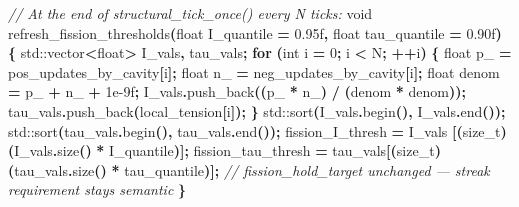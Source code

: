 \documentclass[
  11pt,
  a4paper,
]{article}
\newenvironment{Shaded}{\begin{snugshade}}{\end{snugshade}}
\newcommand{\BuiltInTok}[1]{#1}
\newcommand{\CommentTok}[1]{\textcolor[rgb]{0.56,0.35,0.01}{\textit{#1}}}
\newcommand{\ControlFlowTok}[1]{\textcolor[rgb]{0.13,0.29,0.53}{\textbf{#1}}}
\newcommand{\DataTypeTok}[1]{\textcolor[rgb]{0.13,0.29,0.53}{#1}}
\newcommand{\DecValTok}[1]{\textcolor[rgb]{0.00,0.00,0.81}{#1}}
\newcommand{\FloatTok}[1]{\textcolor[rgb]{0.00,0.00,0.81}{#1}}
\newcommand{\NormalTok}[1]{#1}
\newcommand{\OperatorTok}[1]{\textcolor[rgb]{0.81,0.36,0.00}{\textbf{#1}}}
\newcommand{\VariableTok}[1]{\textcolor[rgb]{0.00,0.00,0.00}{#1}}
\begin{document}
\begin{Shaded}
\begin{Highlighting}[]
\CommentTok{// At the end of structural\_tick\_once() every N ticks:}
\DataTypeTok{void}\NormalTok{ refresh\_fission\_thresholds}\OperatorTok{(}\DataTypeTok{float}\NormalTok{ I\_quantile }\OperatorTok{=} \FloatTok{0.95}\BuiltInTok{f}\OperatorTok{,}
                                \DataTypeTok{float}\NormalTok{ tau\_quantile }\OperatorTok{=} \FloatTok{0.90}\BuiltInTok{f}\OperatorTok{)}
\OperatorTok{\{}
    \BuiltInTok{std::}\NormalTok{vector}\OperatorTok{\textless{}}\DataTypeTok{float}\OperatorTok{\textgreater{}}\NormalTok{ I\_vals}\OperatorTok{,}\NormalTok{ tau\_vals}\OperatorTok{;}
    \ControlFlowTok{for} \OperatorTok{(}\DataTypeTok{int}\NormalTok{ i }\OperatorTok{=} \DecValTok{0}\OperatorTok{;}\NormalTok{ i }\OperatorTok{\textless{}}\NormalTok{ N}\OperatorTok{;} \OperatorTok{++}\NormalTok{i}\OperatorTok{)} \OperatorTok{\{}
        \DataTypeTok{float} \VariableTok{p\_} \OperatorTok{=}\NormalTok{ pos\_updates\_by\_cavity}\OperatorTok{[}\NormalTok{i}\OperatorTok{];}
        \DataTypeTok{float} \VariableTok{n\_} \OperatorTok{=}\NormalTok{ neg\_updates\_by\_cavity}\OperatorTok{[}\NormalTok{i}\OperatorTok{];}
        \DataTypeTok{float}\NormalTok{ denom }\OperatorTok{=} \VariableTok{p\_} \OperatorTok{+} \VariableTok{n\_} \OperatorTok{+} \FloatTok{1e{-}9}\BuiltInTok{f}\OperatorTok{;}
\NormalTok{        I\_vals}\OperatorTok{.}\NormalTok{push\_back}\OperatorTok{((}\VariableTok{p\_} \OperatorTok{*} \VariableTok{n\_}\OperatorTok{)} \OperatorTok{/} \OperatorTok{(}\NormalTok{denom }\OperatorTok{*}\NormalTok{ denom}\OperatorTok{));}
\NormalTok{        tau\_vals}\OperatorTok{.}\NormalTok{push\_back}\OperatorTok{(}\NormalTok{local\_tension}\OperatorTok{[}\NormalTok{i}\OperatorTok{]);}
    \OperatorTok{\}}
    \BuiltInTok{std::}\NormalTok{sort}\OperatorTok{(}\NormalTok{I\_vals}\OperatorTok{.}\NormalTok{begin}\OperatorTok{(),}\NormalTok{ I\_vals}\OperatorTok{.}\NormalTok{end}\OperatorTok{());}
    \BuiltInTok{std::}\NormalTok{sort}\OperatorTok{(}\NormalTok{tau\_vals}\OperatorTok{.}\NormalTok{begin}\OperatorTok{(),}\NormalTok{ tau\_vals}\OperatorTok{.}\NormalTok{end}\OperatorTok{());}
\NormalTok{    fission\_I\_thresh   }\OperatorTok{=}\NormalTok{ I\_vals  }\OperatorTok{[(}\DataTypeTok{size\_t}\OperatorTok{)(}\NormalTok{I\_vals}\OperatorTok{.}\NormalTok{size}\OperatorTok{()}   \OperatorTok{*}\NormalTok{ I\_quantile}\OperatorTok{)];}
\NormalTok{    fission\_tau\_thresh }\OperatorTok{=}\NormalTok{ tau\_vals}\OperatorTok{[(}\DataTypeTok{size\_t}\OperatorTok{)(}\NormalTok{tau\_vals}\OperatorTok{.}\NormalTok{size}\OperatorTok{()} \OperatorTok{*}\NormalTok{ tau\_quantile}\OperatorTok{)];}
    \CommentTok{// fission\_hold\_target unchanged — streak requirement stays semantic}
\OperatorTok{\}}
\end{Highlighting}
\end{Shaded}
\end{document}

